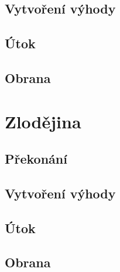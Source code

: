 \documentclass[../main.tex]{subfiles}
\begin{document}
\subsection*{Vytvoření výhody}
\label{subsec:vztahy-vytvoreni}
\vytvoreni

\subsection*{Útok}
\label{subsec:vztahy-utok}
\utok

\subsection*{Obrana}
\label{subsec:vztahy-obrana}
\obrana

\section{Zlodějina}
\label{sec:zlodejina}

\subsection*{Překonání}
\label{subsec:zlodejina-prekonani}
\prekonani

\subsection*{Vytvoření výhody}
\label{subsec:zlodejina-vytvoreni}
\vytvoreni

\subsection*{Útok}
\label{subsec:zlodejina-utok}
\utok

\subsection*{Obrana}
\label{subsec:zlodejina-obrana}
\obrana
\end{document}
